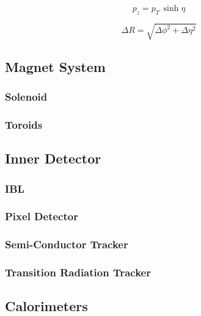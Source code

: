 \begin{equation}
\label{eq:cern:pz}
p_z = p_T \,\sinh \eta
\end{equation}

\begin{equation}
\label{eq:cern:dR}
\Delta R = \sqrt{ \Delta \phi^2 + \Delta \eta^2  }
\end{equation}




\subsection{Magnet System}
\label{sec:cern:atlasmagnets}

\subsubsection*{Solenoid}

\subsubsection*{Toroids}



\subsection{Inner Detector}

\subsubsection*{IBL}

\subsubsection*{Pixel Detector}


\subsubsection*{Semi-Conductor Tracker}


\subsubsection*{Transition Radiation Tracker}



\subsection{Calorimeters}

